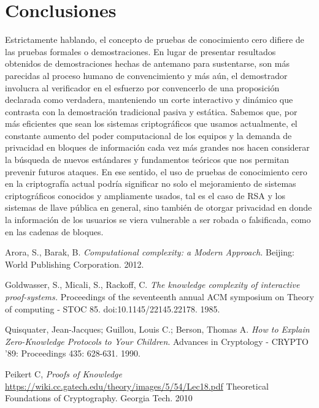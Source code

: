 \documentclass[oneside,10pt]{article}
\begin{document}
\section{Conclusiones}
Estrictamente hablando, el concepto de  pruebas de conocimiento cero difiere de las pruebas formales o demostraciones. En lugar de presentar resultados obtenidos de demostraciones hechas de antemano para sustentarse, son más parecidas al proceso humano de convencimiento y más aún, el demostrador involucra al verificador en el esfuerzo por convencerlo de una proposición declarada como verdadera, manteniendo un corte interactivo y dinámico que contrasta con la demostración tradicional pasiva y estática. 
Sabemos que, por más eficientes que sean los sistemas criptográficos que usamos actualmente, el constante aumento del poder computacional de los equipos y la demanda de privacidad en bloques de información cada vez más grandes nos hacen considerar la búsqueda de nuevos estándares y fundamentos teóricos que nos permitan prevenir futuros ataques.  En ese sentido, el uso de pruebas de conocimiento cero en la criptografía actual podría significar no solo el mejoramiento de sistemas criptográficos conocidos y ampliamente usados, tal es el caso de RSA y los sistemas de llave pública en general, sino también de otorgar privacidad en donde la información de los usuarios se viera vulnerable a ser robada o falsificada, como en las cadenas de bloques. 
\begin{thebibliography}{99}

  Arora, S.,  Barak, B. 
  \emph{Computational complexity: a Modern Approach.}
  Beijing: World Publishing Corporation.
  2012.

  Goldwasser, S., Micali, S.,  Rackoff, C.
  \emph{The knowledge complexity of interactive proof-systems.}
  Proceedings of the seventeenth annual ACM symposium on Theory of computing - STOC 85.
  doi:10.1145/22145.22178.
  1985.

  Quisquater, Jean-Jacques; Guillou, Louis C.; Berson, Thomas A.
  \emph{How to Explain Zero-Knowledge Protocols to Your Children}.
  Advances in Cryptology - CRYPTO '89:
  Proceedings 435: 628-631.
  1990.

  Peikert C,
  \emph{Proofs of Knowledge}
  \href{https://wiki.cc.gatech.edu/theory/images/5/54/Lec18.pdf}
  {https://wiki.cc.gatech.edu/theory/images/5/54/Lec18.pdf}
  Theoretical Foundations of Cryptography.
  Georgia Tech.
  2010
\end{thebibliography}
\end{document}
